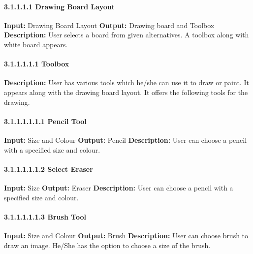 \documentclass{scrreprt}
\begin{document}
\paragraph{3.1.1.1.1 Drawing Board Layout}
\hfill \vspace{2.5mm} \break 
\textbf{Input:} Drawing Board Layout \newline
\textbf{Output:} Drawing board and Toolbox
\vspace{1mm}\newline
\textbf{Description:} \newline 
User selects a board from given alternatives. A toolbox along with white board appears.

\paragraph{3.1.1.1.1.1 Toolbox}
\hfill \vspace{2.5mm} \break 
\textbf{Description:} \newline
User has various tools which
he/she can use it to draw or paint. It appears along with the drawing board layout. It offers the following tools for the drawing.

\paragraph{3.1.1.1.1.1.1 Pencil Tool}
\hfill \vspace{2.5mm} \break 
\textbf{Input:} Size and Colour \newline
\textbf{Output:} Pencil
\vspace{1mm}\newline
\textbf{Description:} \newline 
User can choose a pencil with a specified size and colour.

\paragraph{3.1.1.1.1.1.2 Select Eraser}
\hfill \vspace{2.5mm} \break 
\textbf{Input:} Size \newline
\textbf{Output:} Eraser
\vspace{1mm}\newline
\textbf{Description:} \newline 
User can choose a pencil with a specified size and colour.

\paragraph{3.1.1.1.1.1.3 Brush Tool}
\hfill \vspace{2.5mm} \break 
\textbf{Input:} Size and Colour \newline
\textbf{Output:} Brush
\vspace{1mm}\newline
\textbf{Description:} \newline 
User can choose brush to draw an image. He/She has the option to choose a size of the brush.
\end{document}
